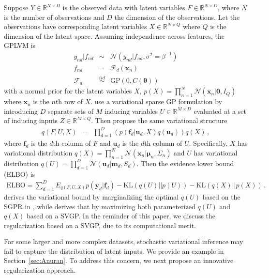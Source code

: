 \documentclass{article}
\begin{document}
Suppose $Y \in \mathbb{R}^{N\times D}$ is the observed data with latent variables $F \in \mathbb{R}^{N\times D}$, where $N$ is the number of observations and $D$ the dimension of the observations. Let the observations have corresponding latent variables $X \in \mathbb{R}^{N \times Q}$ where $Q$ is the dimension of the latent space. Assuming independence across features, the GPLVM is 
\begin{eqnarray}
y_{nd}|f_{nd} & \sim & \mathcal{N}(y_{nd}|f_{nd}, \sigma^2 = \beta^{-1}) \nonumber \\
f_{nd} & = & \mathcal{F}_d(\bm x_n) \nonumber \\
\mathcal{F}_d & \stackrel{iid}{\sim} & \mathrm{GP}(0, C(\bm\theta)) 
\label{GPLVM}
\end{eqnarray}
with a normal prior for the latent variables $X$, 
$p(X) = \prod_{n = 1}^{N}\mathcal{N}(\bm x_n|\bm 0, I_Q)$
where $\bm x_n$ is the $n$th row of $X$. \cite{Titsias_2009, Titsias_2010} use a variational sparse GP formulation by introducing $D$ separate sets of $M$ inducing variables $U \in \mathbb{R}^{M\times D}$ evaluated at a set of inducing inputs $Z\in\mathbb{R}^{M\times Q}$. Then \cite{Titsias_2010, Hensman_2013} propose the same variational structure 
\begin{eqnarray}
q(F, U, X) & = & \prod_{d = 1}^D\left(p(\bm f_d| \bm u_d, X) q(\bm u_d)\right) q(X)\,,
\label{GPLVM_VD}
\end{eqnarray}
where $\bm f_d$ is the $d$th column of $F$ and $\bm u_d$ is the $d$th column of $U$. Specifically, $X$ has variational distribution $q(X) = \prod_{n = 1}^N\mathcal{N}(\bm x_n|\bm \mu_n, \Sigma_n)$ and $U$ has variational distribution $q(U) = \prod_{d = 1}^D\mathcal{N}(\bm u_d| \bm m_d, S_d)$. 
Then the evidence lower bound (ELBO) is 
\begin{eqnarray}
\mathrm{ELBO} = \sum_{d = 1}^{D}E_{q(F, U, X)}p(\bm y_d|\bm f_d) - \mathrm{KL}(q(U)||p(U)) - \mathrm{KL}(q(X)||p(X)) \,.
\end{eqnarray}	
\cite{Titsias_2010} derives the variational bound by marginalizing the optimal $q(U)$ based on the SGPR in \cite{Titsias_2009}, while \cite{Hensman_2013} derives that by maximizing both parameterized $q(U)$ and $q(X)$ based on a SVGP. In the reminder of this paper, we discuss the regularization based on a SVGP, due to its computational merit. 

For some larger and more complex datasets, stochastic variational inference may fail to capture the distribution of latent inputs. We provide an example in Section~\ref{sec:Anuran}. To address this concern, we next propose an innovative regularization approach.
\end{document}
